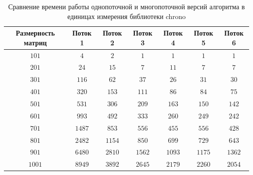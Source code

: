\documentclass[12pt, a4paper]{report}
\begin{document}
\begin{table}[ht!]
	\caption{Сравнение времени работы однопоточной и многопоточной версий алгоритма в единицах измерения библиотеки chrono}
	\label{table2}
	\begin{center}
		\begin{tabular}{|c|c|c|c|c|c|c|}
			\hline
			\bf{Размерность матриц} & \bf{Поток 1} & \bf{Поток 2} & \bf{Поток 3} & \bf{Поток 4} & \bf{Поток 5} & \bf{Поток 6} \\\hline
			
			$101$ & $4$ & $2$ & $1$ & $1$ & $1$ & $1$\\\hline
			
			$201$ & $24$ & $15$ & $7$ & $11$ & $7$ & $7$\\\hline
			
			$301$ & $116$ & $62$ & $37$ & $26$ & $31$ & $30$\\\hline
			
			$401$ & $320$ & $153$ & $111$ & $86$ & $84$ & $75$\\\hline
			
			$501$ & $531$ & $306$ & $209$ & $163$ & $150$ & $142$\\\hline
			
			$601$ & $993$ & $492$ & $333$ & $260$ & $249$ & $242$\\\hline
			
			$701$ & $1487$ & $853$ & $556$ & $455$ & $556$ & $428$\\\hline
			
			$801$ & $2482$ & $1154$ & $850$ & $699$ & $729$ & $643$\\\hline
			
			$901$ & $6480$ & $2810$ & $1562$ & $1093$ & $1175$ & $1362$ \\\hline
			
			$1001$ & $8949$ & $3892$ & $2645$ & $2179$ & $2260$ & $2054$\\\hline
		\end{tabular}
	\end{center}
\end{table}

	
\end{document}
